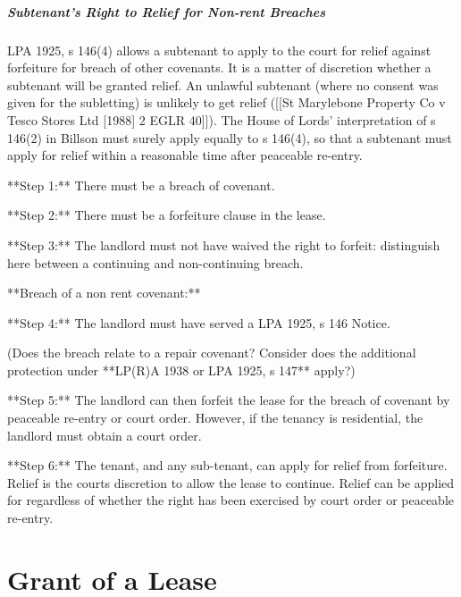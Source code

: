 \documentclass[
]{article}
\newenvironment{Shaded}{}{}
\newcommand{\NormalTok}[1]{#1}
\begin{document}
\hypertarget{subtenants-right-to-relief-for-non-rent-breaches}{%
\subparagraph{Subtenant's Right to Relief for Non-rent
Breaches}\label{subtenants-right-to-relief-for-non-rent-breaches}}

LPA 1925, s 146(4) allows a subtenant to apply to the court for relief
against forfeiture for breach of other covenants. It is a matter of
discretion whether a subtenant will be granted relief. An unlawful
subtenant (where no consent was given for the subletting) is unlikely to
get relief ({[}{[}St Marylebone Property Co v Tesco Stores Ltd
{[}1988{]} 2 EGLR 40{]}{]}). The House of Lords' interpretation of s
146(2) in Billson must surely apply equally to s 146(4), so that a
subtenant must apply for relief within a reasonable time after peaceable
re-entry.

\begin{Shaded}
\begin{Highlighting}[]
\NormalTok{**Step 1:** There must be a breach of covenant.}

\NormalTok{**Step 2:** There must be a forfeiture clause in the lease.}

\NormalTok{**Step 3:** The landlord must not have waived the right to forfeit: distinguish here between a continuing and non{-}continuing breach.}

\NormalTok{**Breach of a non rent covenant:**}

\NormalTok{**Step 4:** The landlord must have served a LPA 1925, s 146 Notice.}

\NormalTok{(Does the breach relate to a repair covenant? Consider does the additional protection under **LP(R)A 1938 or LPA 1925, s 147** apply?)}

\NormalTok{**Step 5:** The landlord can then forfeit the lease for the breach of covenant by peaceable re{-}entry or court order. However, if the tenancy is residential, the landlord must obtain a court order.}

\NormalTok{**Step 6:** The tenant, and any sub{-}tenant, can apply for relief from forfeiture. Relief is the court\textquotesingle{}s discretion to allow the lease to continue. Relief can be applied for regardless of whether the right has been exercised by court order or peaceable re{-}entry.}
\end{Highlighting}
\end{Shaded}

\hypertarget{grant-of-a-lease}{%
\section{Grant of a Lease}\label{grant-of-a-lease}}
\end{document}
